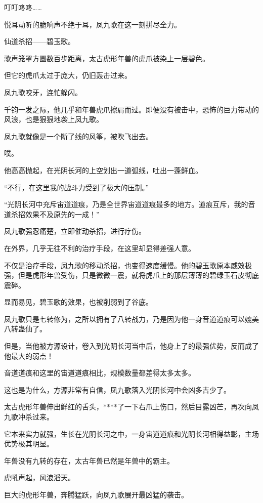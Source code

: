 
\begin{this_body}

叮叮咚咚……

悦耳动听的脆响声不绝于耳，凤九歌在这一刻拼尽全力。

仙道杀招——碧玉歌。

歌声笼罩方圆数百步距离，太古虎形年兽的虎爪被染上一层碧色。

但它的虎爪太过于庞大，仍旧轰击过来。

凤九歌咬牙，连忙躲闪。

千钧一发之际，他几乎和年兽虎爪擦肩而过。即便没有被击中，恐怖的巨力带动的风浪，也是狠狠地袭上凤九歌。

凤九歌就像是一个断了线的风筝，被吹飞出去。

噗。

他高高抛起，在光阴长河的上空划出一道弧线，吐出一蓬鲜血。

“不行，在这里我的战斗力受到了极大的压制。”

“光阴长河中充斥宙道道痕，乃是全世界宙道道痕最多的地方。道痕互斥，我的音道杀招效果不及原先的一成！”

凤九歌强忍痛楚，立即催动杀招，进行疗伤。

在外界，几乎无往不利的治疗手段，在这里却显得差强人意。

不仅是治疗手段，凤九歌的移动杀招，也变得速度缓慢。他的碧玉歌原本威效极强，但是虎形年兽受伤，只是微微一震，就将虎爪上的那层薄薄的碧绿玉石皮彻底震碎。

显而易见，碧玉歌的效果，也被削弱到了谷底。

凤九歌只是七转修为，之所以拥有了八转战力，乃是因为他一身音道道痕可以媲美八转蛊仙了。

但是，当他被方源设计，卷入到光阴长河当中后，他身上了的最强优势，反而成了他最大的弱点！

音道道痕和这里的宙道道痕相比，规模数量都差得太多太多。

这也是为什么，方源非常有自信，凤九歌落入光阴长河中会凶多吉少了。

太古虎形年兽伸出鲜红的舌头，****了一下右爪上伤口，然后目露凶芒，再次向凤九歌冲杀过来。

它本来实力就强，生长在光阴长河之中，一身宙道道痕和光阴长河相得益彰，主场优势极其明显。

年兽没有九转的存在，太古年兽已然是年兽中的霸主。

虎吼声起，风浪滔天。

巨大的虎形年兽，奔腾猛跃，向凤九歌展开最凶猛的袭击。


\end{this_body}
